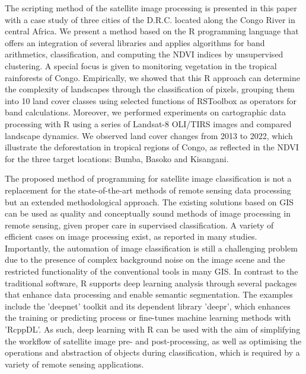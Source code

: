 \documentclass[applsci,article,accept,pdftex,moreauthors]{Definitions/mdpi}
\begin{document}
The scripting method of the satellite image processing is presented in this paper with a case study of three cities {of the D.R.C. }located along the Congo River in central Africa. We present a method based on the R programming language that offers an integration of several libraries and applies algorithms for band arithmetics, classification, and computing the NDVI indices {by} unsupervised clustering. A special focus is given to monitoring vegetation {in} the tropical rainforests of Congo. Empirically, we showed that this {R} approach can determine the complexity of landscapes through the classification of pixels, grouping them into 10 land cover classes using selected functions of RSToolbox as operators for band calculations. Moreover, we performed experiments on cartographic data processing with R using a series of Landsat-8 OLI/TIRS images and compared landscape dynamics. We observed land cover changes from 2013 to 2022, which illustrate the deforestation in tropical regions of Congo, as reflected in the NDVI for the three target locations: Bumba, Basoko and Kisangani.

The proposed method of programming for satellite image classification is not a replacement for the state-of-the-art methods of remote sensing data processing{ but an extended methodological approach. }The existing solutions based on GIS can be used as quality and conceptually sound methods of image processing in remote sensing, given proper care in supervised classification. A variety of efficient cases on image processing exist, as reported in many studies. Importantly, the automation of image classification is still a challenging problem due to the presence of complex background noise on the image scene and the restricted functionality of the conventional tools in many GIS. In contrast to the traditional software, R supports deep learning analysis through several packages that enhance data processing and enable semantic segmentation. The examples include the 'deepnet' toolkit and its dependent library 'deepr', which enhances the training or predicting process or fine-tunes machine learning methods with 'RcppDL'. As such, deep learning with R can be used with the aim of simplifying the workflow of satellite image pre- and post-processing, as well as optimising the operations and abstraction of objects during classification, which is required by a variety of remote sensing applications.
\end{document}
